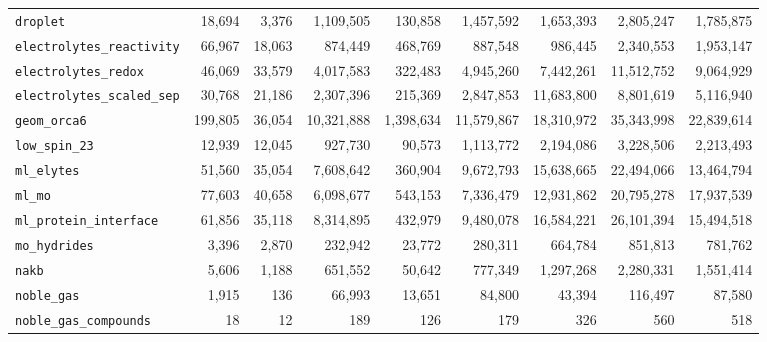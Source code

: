 \begin{scriptsize}
\begin{longtable}{lrrrrrrrr}
\texttt{droplet}                 &     18{,}694 &      3{,}376 &   1{,}109{,}505 &     130{,}858 &   1{,}457{,}592 &    1{,}653{,}393 &    2{,}805{,}247 &    1{,}785{,}875 \\
\texttt{electrolytes\_reactivity} &     66{,}967 &     18{,}063 &     874{,}449 &     468{,}769 &     887{,}548 &      986{,}445 &    2{,}340{,}553 &    1{,}953{,}147 \\
\texttt{electrolytes\_redox}      &     46{,}069 &     33{,}579 &   4{,}017{,}583 &     322{,}483 &   4{,}945{,}260 &    7{,}442{,}261 &   11{,}512{,}752 &    9{,}064{,}929 \\
\texttt{electrolytes\_scaled\_sep}&     30{,}768 &     21{,}186 &   2{,}307{,}396 &     215{,}369 &   2{,}847{,}853 &   11{,}683{,}800 &    8{,}801{,}619 &    5{,}116{,}940 \\
\texttt{geom\_orca6}              &    199{,}805 &     36{,}054 &  10{,}321{,}888 &   1{,}398{,}634 &  11{,}579{,}867 &   18{,}310{,}972 &   35{,}343{,}998 &   22{,}839{,}614 \\
\texttt{low\_spin\_23}             &     12{,}939 &     12{,}045 &     927{,}730 &      90{,}573 &   1{,}113{,}772 &    2{,}194{,}086 &    3{,}228{,}506 &    2{,}213{,}493 \\
\texttt{ml\_elytes}               &     51{,}560 &     35{,}054 &   7{,}608{,}642 &     360{,}904 &   9{,}672{,}793 &   15{,}638{,}665 &   22{,}494{,}066 &   13{,}464{,}794 \\
\texttt{ml\_mo}                   &     77{,}603 &     40{,}658 &   6{,}098{,}677 &     543{,}153 &   7{,}336{,}479 &   12{,}931{,}862 &   20{,}795{,}278 &   17{,}937{,}539 \\
\texttt{ml\_protein\_interface}    &     61{,}856 &     35{,}118 &   8{,}314{,}895 &     432{,}979 &   9{,}480{,}078 &   16{,}584{,}221 &   26{,}101{,}394 &   15{,}494{,}518 \\
\texttt{mo\_hydrides}             &      3{,}396 &      2{,}870 &     232{,}942 &      23{,}772 &     280{,}311 &      664{,}784 &      851{,}813 &      781{,}762 \\
\texttt{nakb}                    &      5{,}606 &      1{,}188 &     651{,}552 &      50{,}642 &     777{,}349 &    1{,}297{,}268 &    2{,}280{,}331 &    1{,}551{,}414 \\
\texttt{noble\_gas}               &      1{,}915 &        136 &      66{,}993 &      13{,}651 &      84{,}800 &       43{,}394 &      116{,}497 &       87{,}580 \\
\texttt{noble\_gas\_compounds}     &         18 &         12 &         189 &         126 &         179 &          326 &          560 &          518 \\

\end{longtable}
\end{scriptsize}
